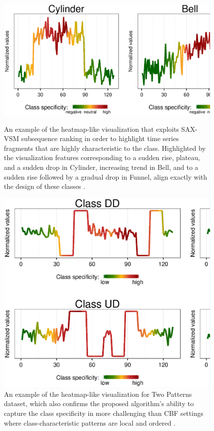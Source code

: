 \begin{figure}[!h]
   \centering
   \includegraphics[width=130mm]{figures/cbf-heatmap.ps}
   \caption{An example of the heatmap-like visualization that exploits SAX-VSM subsequence ranking in order to 
   highlight time series fragments that are highly characteristic to the class.
   Highlighted by the visualization features corresponding to a sudden rise, plateau, and a sudden drop in Cylinder, 
   increasing trend in Bell,
   and to a sudden rise followed by a gradual drop in Funnel, 
   align exactly with the design of these classes \cite{cbf}.}
   \label{fig:heat1}
   \includegraphics[width=130mm]{figures/2patterns-heatmap.ps}
   \caption{An example of the heatmap-like visualization for Two Patterns dataset, which also confirms the proposed 
   algorithm's ability to capture the class specificity in more challenging than CBF settings where class-characteristic 
   patterns are local and ordered \cite{two_patterns}.}
   \label{fig:heat2}
\end{figure}

